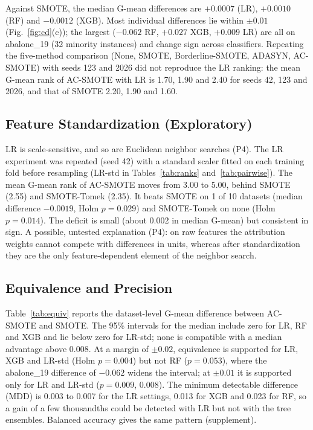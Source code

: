 \documentclass[conference,a4paper]{IEEEtran}
\newcommand{\acs}{AC-SMOTE}
\newcommand{\gmean}{\mbox{G-mean}}
\begin{document}
Against SMOTE, the median \gmean{} differences are $+0.0007$ (LR), $+0.0010$ (RF) and $-0.0012$ (XGB). Most individual differences lie within $\pm 0.01$ (Fig.~\ref{fig:cd}(c)); the largest ($-0.062$ RF, $+0.027$ XGB, $+0.009$ LR) are all on abalone\_19 (32 minority instances) and change sign across classifiers. Repeating the five-method comparison (None, SMOTE, Borderline-SMOTE, ADASYN, \acs{}) with seeds 123 and 2026 did not reproduce the LR ranking: the mean \gmean{} rank of \acs{} with LR is 1.70, 1.90 and 2.40 for seeds 42, 123 and 2026, and that of SMOTE 2.20, 1.90 and 1.60.

\begin{table}[t]
\caption{\acs{} versus each baseline: wins/losses over the ten datasets (Holm-adjusted $p$). Bold: Holm $p<0.05$. LR: raw features; LR-std: standardized (exploratory).}\label{tab:pairwise}
\centering\footnotesize
\setlength{\tabcolsep}{4pt}

\end{table}

\subsection{Feature Standardization (Exploratory)}\label{sec:std}
LR is scale-sensitive, and so are Euclidean neighbor searches (P4). The LR experiment was repeated (seed 42) with a standard scaler fitted on each training fold before resampling (LR-std in Tables~\ref{tab:ranks} and~\ref{tab:pairwise}). The mean \gmean{} rank of \acs{} moves from 3.00 to 5.00, behind SMOTE (2.55) and SMOTE-Tomek (2.35). It beats SMOTE on 1 of 10 datasets (median difference $-0.0019$, Holm $p=0.029$) and SMOTE-Tomek on none (Holm $p=0.014$). The deficit is small (about 0.002 in median \gmean{}) but consistent in sign. A possible, untested explanation (P4): on raw features the attribution weights cannot compete with differences in units, whereas after standardization they are the only feature-dependent element of the neighbor search.

\subsection{Equivalence and Precision}\label{sec:equiv}
Table~\ref{tab:equiv} reports the dataset-level \gmean{} difference between \acs{} and SMOTE. The 95\% intervals for the median include zero for LR, RF and XGB and lie below zero for LR-std; none is compatible with a median advantage above 0.008. At a margin of $\pm0.02$, equivalence is supported for LR, XGB and LR-std (Holm $p=0.004$) but not RF ($p=0.053$), where the abalone\_19 difference of $-0.062$ widens the interval; at $\pm0.01$ it is supported only for LR and LR-std ($p=0.009$, 0.008). The minimum detectable difference (MDD) is 0.003 to 0.007 for the LR settings, 0.013 for XGB and 0.023 for RF, so a gain of a few thousandths could be detected with LR but not with the tree ensembles. Balanced accuracy gives the same pattern (supplement).
\end{document}
